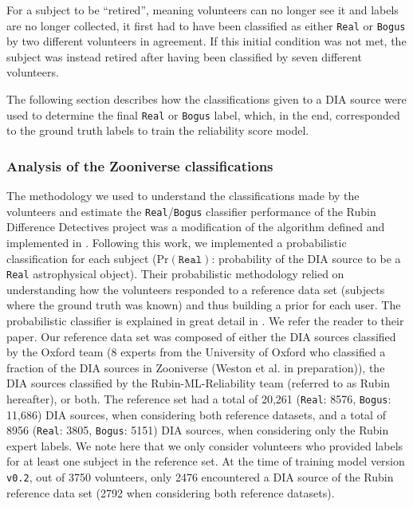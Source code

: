 \documentclass[DM,authoryear,toc]{lsstdoc}
\newcommand{\V}[1]{{\texttt{v0.#1}}}
\begin{document}
For a subject to be ``retired'', meaning volunteers can no longer see it and labels are no longer collected, it first had to have been classified as either \texttt{Real} or \texttt{Bogus} by two different volunteers in agreement. If this initial condition was not met, the subject was instead retired after having been classified by seven different volunteers. 

The following section describes how the classifications given to a DIA source were used to determine the final \texttt{Real} or \texttt{Bogus} label, which, in the end, corresponded to the ground truth labels to train the reliability score model.




\subsubsection{Analysis of the Zooniverse classifications}\label{sec:bayesian}


The methodology we used to understand the classifications made by the volunteers and estimate the \texttt{Real}/\texttt{Bogus} classifier performance of the Rubin Difference Detectives project was a modification of the algorithm defined and implemented in \cite{marshall2016space}. %
Following this work, we implemented a probabilistic classification for each subject ($\text{Pr}(\texttt{Real})$: probability of the DIA source to be a \texttt{Real} astrophysical object). %
Their probabilistic methodology relied on understanding how the volunteers responded to a reference data set (subjects where the ground truth was known) and thus building a prior for each user. The probabilistic classifier is explained in great detail in \cite{marshall2016space}. We refer the reader to their paper. 
Our reference data set was composed of either the DIA sources classified by the Oxford team (8 experts from the University of Oxford who classified a fraction of the DIA sources in Zooniverse (Weston et al. in preparation)), the DIA sources classified by the Rubin-ML-Reliability team (referred to as Rubin hereafter), or both. The reference set had a total of 20,261 (\texttt{Real}: 8576, \texttt{Bogus}: 11,686) DIA sources, when considering both reference datasets, and a total of 8956 (\texttt{Real}: 3805, \texttt{Bogus}: 5151)  DIA sources, when considering only the Rubin expert labels.  We note here that we only consider volunteers who provided labels for at least one subject in the reference set. At the time of training model version \V2, out of 3750 volunteers, only 2476 encountered a DIA source of the Rubin reference data set (2792 when considering both reference datasets). 
\end{document}
